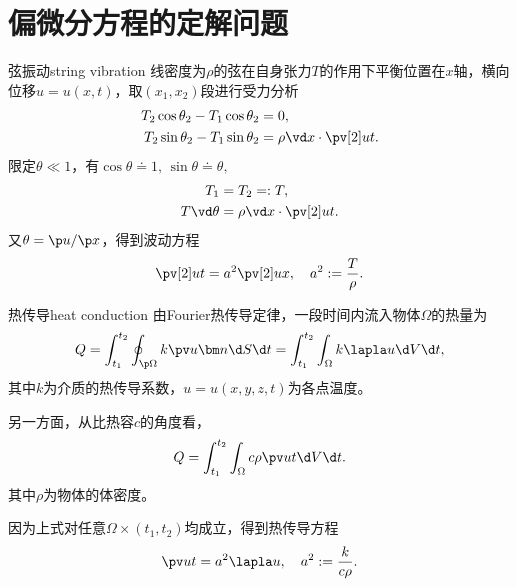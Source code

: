 \chapter{偏微分方程的定解问题}
\begin{example}{弦振动}{string vibration}
	线密度为$\rho$的弦在自身张力$T$的作用下平衡位置在$x$轴，横向位移$u=u(x,t)$，取$(x_1,x_2)$段进行受力分析
	\begin{align*}
		T_2\cos\theta_2-T_1\cos\theta_2&=0,\\
		T_2\sin\theta_2-T_1\sin\theta_2&=\rho\vd x\cdot\pv[2]ut.
	\end{align*}
	限定$\theta\ll 1$，有$\cos\theta\doteq 1,\,\sin\theta\doteq\theta,$
	\begin{align*}
		T_1&=T_2=:T,\\
		T\vd\theta&=\rho\vd x\cdot\pv[2]ut.
	\end{align*}
	又$\theta=\p u/\p x$，得到波动方程
	\begin{align}
		\pv[2]ut=a^2\pv[2]ux,\quad a^2:=\frac T\rho.
	\end{align}
\end{example}
\begin{example}{热传导}{heat conduction}
	由Fourier热传导定律，一段时间内流入物体$\Omega$的热量为
	\[
		Q=\int_{t_1}^{t_2}\oint_{\p\Omega}k\pv u{\bm n}\d S\d t=\int_{t_1}^{t_2}\int_\Omega k\lapla u\d V\d t,
	\]
	其中$k$为介质的热传导系数，$u=u(x,y,z,t)$为各点温度。
	
	另一方面，从比热容$c$的角度看，
	\[
		Q=\int_{t_1}^{t_2}\int_\Omega c\rho\pv ut\d V\d t.
	\]
	其中$\rho$为物体的体密度。
	
	因为上式对任意$\Omega\times(t_1,t_2)$均成立，得到热传导方程
	\begin{align}
		\pv ut=a^2\lapla u,\quad a^2:=\frac k{c\rho}.
	\end{align}
\end{example}

